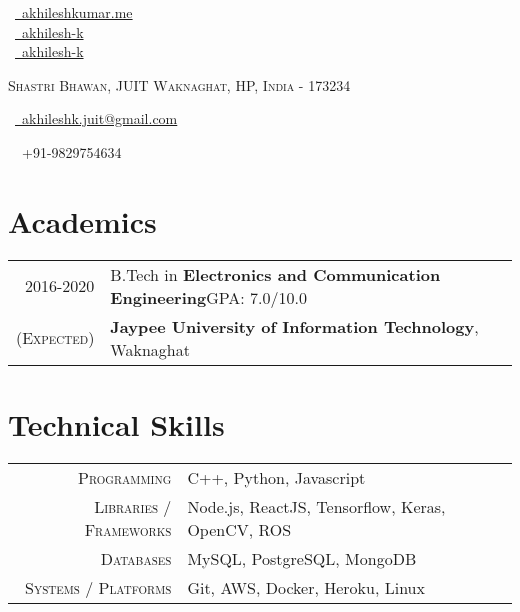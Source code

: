 \documentclass[a4paper,10pt]{extarticle}
\begin{document}
\pagestyle{empty}

\begin{multicols}{3}
\normalsize  \faGlobe\ {\href{http://akhileshkumar.me/}{\  akhileshkumar.me}}\\
\normalsize \faGithub\ {\href{https://github.com/akhilesh-k}{\  akhilesh-k}}\\
\normalsize  \faLinkedinSquare\ {\href{https://www.linkedin.com/in/akhilesh-k}{\  akhilesh-k}}\\
\columnbreak
\normalsize\par{\par}
\par{\centering\normalsize {\textsc{Shastri Bhawan, JUIT Waknaghat, HP, India - 173234}}\hfill\par}
\columnbreak
\raggedright\hfill\normalsize \faEnvelope\ {\href{mailto:akhileshk.juit@gmail.com}{\  akhileshk.juit@gmail.com}}\\
\raggedright\hfill{\faPhone\ \  +91-9829754634}\\
\end{multicols}

\vspace{-0.6cm}
\section{\textcolor{primary}{Academics}}
\begin{tabular}{r|p{17.5cm}}	
2016-2020 & B.Tech in \textbf{Electronics and Communication Engineering}\hfill\textsc{GPA}: 7.0/10.0\\
\textsc{(Expected)}&\textbf{Jaypee University of Information Technology}, Waknaghat\\

\end{tabular}
\section{\textcolor{primary}{Technical Skills}}

\begin{tabular}{r|p{15cm}}
\textsc{Programming} & C++, Python, Javascript\\
\textsc{Libraries / Frameworks} & Node.js, ReactJS, Tensorflow, Keras, OpenCV, ROS\\
\textsc{Databases} & MySQL, PostgreSQL, MongoDB\\
\textsc{Systems / Platforms} & Git, AWS, Docker, Heroku, Linux\\
\end{tabular}
\end{document}
